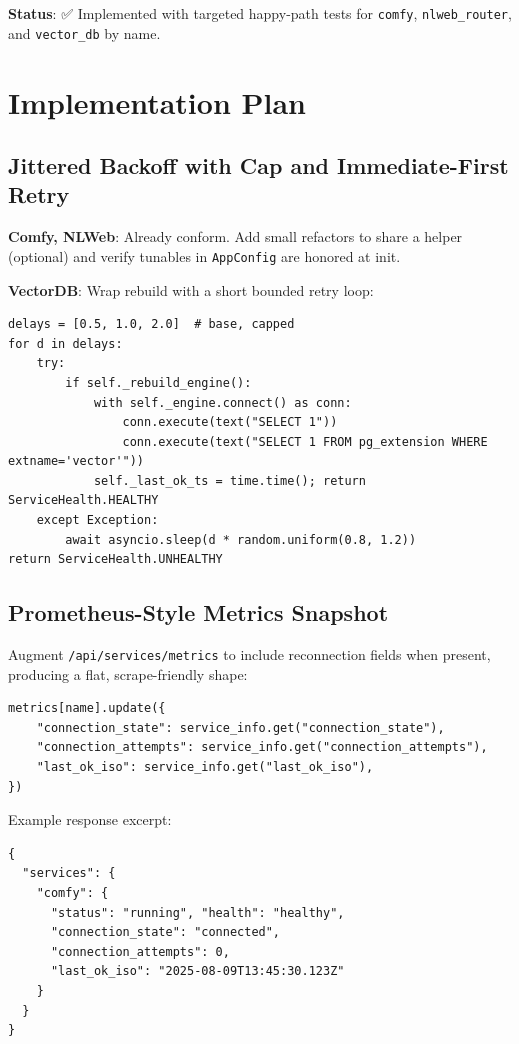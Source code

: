 \documentclass[11pt]{article}
\begin{document}
\textbf{Status}: ✅ Implemented with targeted happy-path tests for \texttt{comfy}, \texttt{nlweb\_router}, and \texttt{vector\_db} by name.

\section{Implementation Plan}

\subsection{Jittered Backoff with Cap and Immediate-First Retry}
\textbf{Comfy, NLWeb}: Already conform. Add small refactors to share a helper (optional) and verify tunables in \texttt{AppConfig} are honored at init.

\textbf{VectorDB}: Wrap rebuild with a short bounded retry loop:
\begin{verbatim}
delays = [0.5, 1.0, 2.0]  # base, capped
for d in delays:
    try:
        if self._rebuild_engine():
            with self._engine.connect() as conn:
                conn.execute(text("SELECT 1"))
                conn.execute(text("SELECT 1 FROM pg_extension WHERE extname='vector'"))
            self._last_ok_ts = time.time(); return ServiceHealth.HEALTHY
    except Exception:
        await asyncio.sleep(d * random.uniform(0.8, 1.2))
return ServiceHealth.UNHEALTHY
\end{verbatim}

\subsection{Prometheus-Style Metrics Snapshot}
Augment \texttt{/api/services/metrics} to include reconnection fields when present, producing a flat, scrape-friendly shape:
\begin{verbatim}
metrics[name].update({
    "connection_state": service_info.get("connection_state"),
    "connection_attempts": service_info.get("connection_attempts"),
    "last_ok_iso": service_info.get("last_ok_iso"),
})
\end{verbatim}

\noindent Example response excerpt:
\begin{verbatim}
{
  "services": {
    "comfy": {
      "status": "running", "health": "healthy",
      "connection_state": "connected",
      "connection_attempts": 0,
      "last_ok_iso": "2025-08-09T13:45:30.123Z"
    }
  }
}
\end{verbatim}
\end{document}
